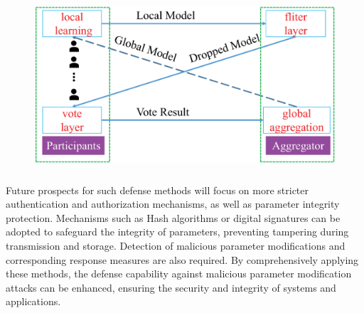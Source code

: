 \begin{figure}[h]
    \centering
    \includegraphics[width=1.0\linewidth,height=2.5in]{output/fig19.eps}
     \caption{}
     \label{fig19}
\end{figure}


Future prospects for such defense methods will
focus on more stricter authentication and authorization
mechanisms, as well as parameter integrity protection.
Mechanisms such as Hash algorithms or digital signatures
can be adopted to safeguard the integrity of parameters,
preventing tampering during transmission and storage.
Detection of malicious parameter modifications and
corresponding response measures are also required.
By comprehensively applying these methods, the defense capability
against malicious parameter modification attacks can be
enhanced, ensuring the security and integrity of systems
and applications.